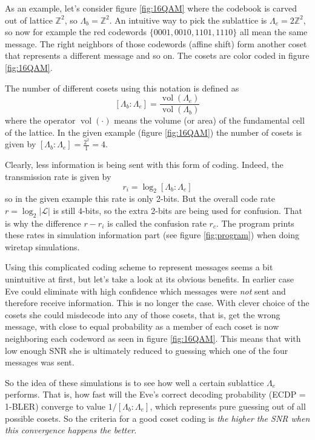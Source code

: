 \documentclass[english,12pt,a4paper,pdftex,sci,utf8]{aaltothesis}
\begin{document}
As an example, let's consider figure \ref{fig:16QAM} where the codebook is carved out of lattice $\mathbb{Z}^2$, so $\Lambda_b = \mathbb{Z}^2$. An intuitive way to pick the sublattice is $\Lambda_e = 2\mathbb{Z}^2$, so now for example the red codewords $\{0001, 0010, 1101, 1110\}$ all mean the same message. The right neighbors of those codewords (affine shift) form another coset that represents a different message and so on. The cosets are color coded in figure \ref{fig:16QAM}.
\par The number of different cosets using this notation is defined as
\begin{equation}
\left[\Lambda_b : \Lambda_e\right] = \frac{\operatorname{vol}(\Lambda_e)}{\operatorname{vol}(\Lambda_b)} 
\end{equation}
where the operator $\operatorname{vol}(\cdot)$ means the volume (or area) of the fundamental cell of the lattice. In the given example (figure \ref{fig:16QAM}) the number of cosets is given by $\left[\Lambda_b : \Lambda_e\right] = \frac{2^2}{1} = 4$. 
\par Clearly, less information is being sent with this form of coding. Indeed, the transmission rate is given by 
\begin{equation}
r_i = \log_2{\left[\Lambda_b : \Lambda_e\right]}
\end{equation}
so in the given example this rate is only 2-bits. But the overall code rate $r=\log_2{|\mathcal{L}|}$ is still 4-bits, so the extra 2-bits are being used for confusion. That is why the difference $r-r_i$ is called the confusion rate $r_c$. The program prints these rates in simulation information part (see figure \ref{fig:program}) when doing wiretap simulations.
\par Using this complicated coding scheme to represent messages seems a bit unintuitive at first, but let's take a look at its obvious benefits. In earlier case Eve could eliminate with high confidence which messages were \emph{not} sent and therefore receive information. This is no longer the case. With clever choice of the cosets she could misdecode into any of those cosets, that is, get the wrong message, with close to equal probability as a member of each coset is now neighboring each codeword as seen in figure \ref{fig:16QAM}. This means that with low enough SNR she is ultimately reduced to guessing which one of the four messages was sent.
\par So the idea of these simulations is to see how well a certain sublattice $\Lambda_e$ performs. That is, how fast will the Eve's correct decoding probability (ECDP = 1-BLER) converge to value $1/\left[\Lambda_b : \Lambda_e\right]$, which represents pure guessing out of all possible cosets. So the criteria for a good coset coding is \emph{the higher the SNR when this convergence happens the better}.
\end{document}
